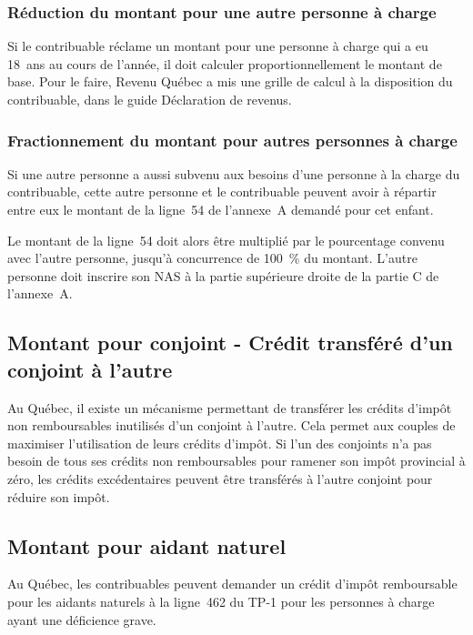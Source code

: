 \subsubsection{Réduction du montant pour une autre personne à charge}
Si le contribuable réclame un montant pour une personne à charge qui a eu 18~ans au cours de l'année, il doit calculer proportionnellement le montant de base. Pour le faire, Revenu Québec a mis une grille de calcul à la disposition du contribuable, dans le guide Déclaration de revenus.


\subsubsection{Fractionnement du montant pour autres personnes à charge}
Si une autre personne a aussi subvenu aux besoins d'une personne à la charge du contribuable, cette autre personne et le contribuable peuvent avoir à répartir entre eux le montant de la ligne~54 de l'annexe~A demandé pour cet enfant. 

Le montant de la ligne~54 doit alors être multiplié par le pourcentage convenu avec l'autre personne, jusqu'à concurrence de 100~\% du montant. L'autre personne doit inscrire son NAS à la partie supérieure droite de la partie C de l'annexe~A. 

\subsection{Montant pour conjoint - Crédit transféré d'un conjoint à l'autre}
Au Québec, il existe un mécanisme permettant de transférer les crédits d'impôt non remboursables inutilisés d'un conjoint à l'autre. Cela permet aux couples de maximiser l'utilisation de leurs crédits d'impôt. Si l'un des conjoints n'a pas besoin de tous ses crédits non remboursables pour ramener son impôt provincial à zéro, les crédits excédentaires peuvent être transférés à l'autre conjoint pour réduire son impôt.

\subsection{Montant pour aidant naturel}
Au Québec, les contribuables peuvent demander un crédit d'impôt remboursable pour les aidants naturels à la ligne~462 du TP-1 pour les personnes à charge ayant une déficience grave.



